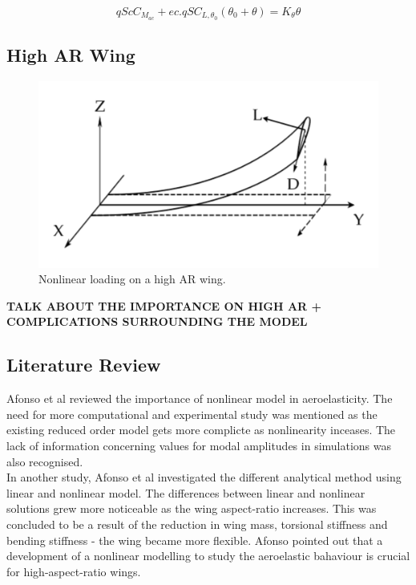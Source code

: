 \documentclass[11pt]{article}
\begin{document}

\begin{equation}
qScC_{M_{ac}} + ec. qSC_{L,{\theta _0}}(\theta _0 + \theta) = K_{\theta}\theta
\end{equation}

\subsection{High AR Wing}

\begin{figure}[H]
    \centering
    \includegraphics[width = .55\textwidth]{figures/Eaton-highly-flexible-wing.png}
    \caption{Nonlinear loading on a high AR wing.}
    \label{fig:high-AR-load}
\end{figure}

\textbf{TALK ABOUT THE IMPORTANCE ON HIGH AR + COMPLICATIONS SURROUNDING THE MODEL}

\subsection{Literature Review}
Afonso et al\cite{Afonso2017AWings} reviewed the importance of nonlinear model in aeroelasticity. The need for more computational and experimental study was mentioned as the existing reduced order model gets more complicte as nonlinearity inceases. The lack of information concerning values for modal amplitudes in simulations was also recognised.\\

In another study, Afonso et al \cite{Afonso2015LINEARWINGS} investigated the different analytical method using linear and nonlinear model. The differences between linear and nonlinear solutions grew more noticeable as the wing aspect-ratio increases. This was concluded to be a result of the reduction in wing mass, torsional stiffness and bending stiffness - the wing became more flexible. Afonso pointed out that a development of a nonlinear modelling to study the aeroelastic bahaviour is crucial for high-aspect-ratio wings.\\
\end{document}
